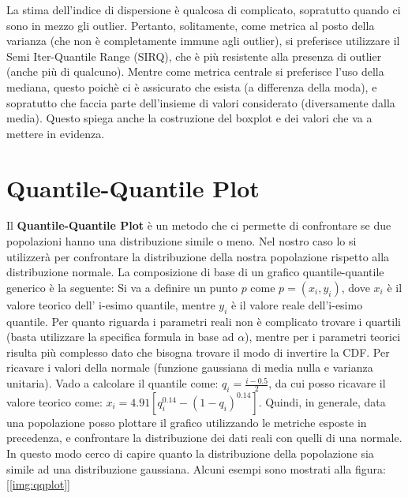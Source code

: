 La stima dell'indice di dispersione è qualcosa di complicato, sopratutto quando ci sono in mezzo gli outlier. Pertanto, solitamente, come metrica al posto della varianza (che non è completamente immune agli outlier), si preferisce utilizzare il Semi Iter-Quantile Range (SIRQ), che è più resistente alla presenza di outlier (anche più di qualcuno). Mentre come metrica centrale si preferisce l'uso della mediana, questo poichè ci è assicurato che esista (a differenza della moda), e sopratutto che faccia parte dell'insieme di valori considerato (diversamente dalla media). Questo spiega anche la costruzione del boxplot e dei valori che va a mettere in evidenza.

\section{Quantile-Quantile Plot}
Il \textbf{Quantile-Quantile Plot} è un metodo che ci permette di confrontare se due popolazioni hanno una distribuzione simile o meno. Nel nostro caso lo si utilizzerà per confrontare la distribuzione della nostra popolazione rispetto alla distribuzione normale.
La composizione di base di un grafico quantile-quantile generico è la seguente:
Si va a definire un punto \(p\) come \(p = (x_i, y_i)\), dove \(x_i\) è il valore teorico dell' i-esimo quantile, mentre \(y_i\) è il valore reale dell'i-esimo quantile. Per quanto riguarda i parametri reali non è complicato trovare i quartili (basta utilizzare la specifica formula in base ad \(\alpha\)), mentre per i parametri teorici risulta più complesso dato che bisogna trovare il modo di invertire la CDF. Per ricavare i valori della normale (funzione gaussiana di media nulla e varianza unitaria). Vado a calcolare il quantile come: \(q_i = \frac{i-0.5}{2}\), da cui posso ricavare il valore teorico come: \(x_i = 4.91\left [ q_i^{0.14} - (1-q_i)^{0.14} \right ]\).
Quindi, in generale, data una popolazione posso plottare il grafico utilizzando le metriche esposte in precedenza, e confrontare la distribuzione dei dati reali con quelli di una normale. In questo modo cerco di capire quanto la distribuzione della popolazione sia simile ad una distribuzione gaussiana. Alcuni esempi sono mostrati alla figura: [\ref{img:qqplot}]


